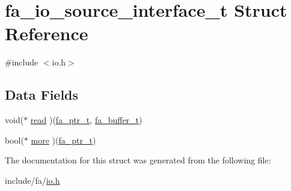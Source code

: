 \hypertarget{structfa__io__source__interface__t}{\section{fa\-\_\-io\-\_\-source\-\_\-interface\-\_\-t Struct Reference}
\label{structfa__io__source__interface__t}
}


{\ttfamily \#include $<$io.\-h$>$}

\subsection*{Data Fields}
\begin{DoxyCompactItemize}
\item 
void($\ast$ \hyperlink{group___fa_gaca852e8ee5795712769ac0d9b4240dff}{read} )(\hyperlink{group___fa_ga915ddeae99ad7568b273d2b876425197}{fa\-\_\-ptr\-\_\-t}, \hyperlink{group___fa_buffer_ga0ed7a1d783ab322e2e8be02432d0839e}{fa\-\_\-buffer\-\_\-t})
\item 
bool($\ast$ \hyperlink{group___fa_ga6f2254b3a07552baa2a3f2dffaba5898}{more} )(\hyperlink{group___fa_ga915ddeae99ad7568b273d2b876425197}{fa\-\_\-ptr\-\_\-t})
\end{DoxyCompactItemize}


The documentation for this struct was generated from the following file\-:\begin{DoxyCompactItemize}
\item 
include/fa/\hyperlink{io_8h}{io.\-h}\end{DoxyCompactItemize}
